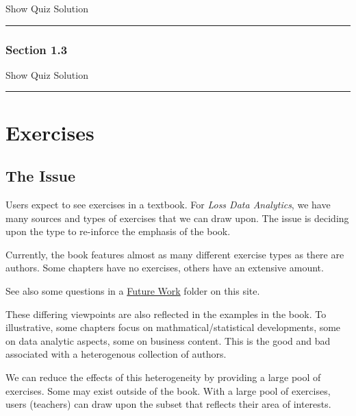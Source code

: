 \documentclass[
]{book}
\begin{document}
\hypertarget{surveyResult12}{}

Show Quiz Solution

\hypertarget{display.Quiz12.2}{}
\begin{center}\rule{0.5\linewidth}{0.5pt}\end{center}

\hypertarget{section-1.3}{%
\subsection{Section 1.3}\label{section-1.3}}

\hypertarget{surveyElement13}{}

\hypertarget{surveyResult13}{}

Show Quiz Solution

\hypertarget{display.Quiz13.2}{}
\begin{center}\rule{0.5\linewidth}{0.5pt}\end{center}

\hypertarget{S:Exercises}{%
\chapter{Exercises}\label{S:Exercises}}

\hypertarget{the-issue}{%
\section{The Issue}\label{the-issue}}

Users expect to see exercises in a textbook. For \emph{Loss Data Analytics}, we have many sources and types of exercises that we can draw upon. The issue is deciding upon the type to re-inforce the emphasis of the book.

Currently, the book features almost as many different exercise types as there are authors. Some chapters have no exercises, others have an extensive amount.

See also some questions in a \href{https://github.com/ewfrees/InteractiveLDA/tree/master/FutureWork}{Future Work} folder on this site.

These differing viewpoints are also reflected in the examples in the book. To illustrative, some chapters focus on mathmatical/statistical developments, some on data analytic aspects, some on business content. This is the good and bad associated with a heterogenous collection of authors.

We can reduce the effects of this heterogeneity by providing a large pool of exercises. Some may exist outside of the book. With a large pool of exercises, users (teachers) can draw upon the subset that reflects their area of interests.
\end{document}
